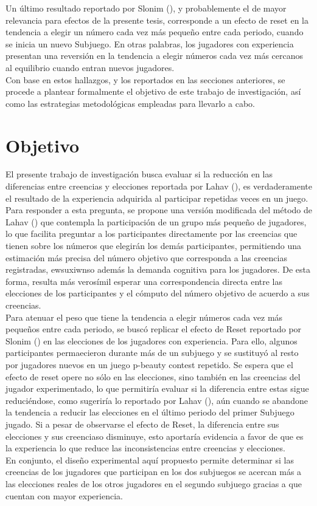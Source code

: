 Un último resultado reportado por Slonim (\citeyear{Slonim}), y probablemente el de mayor relevancia para efectos de la presente tesis, corresponde a un efecto de reset en la tendencia a elegir un número cada vez más pequeño entre cada periodo, cuando se inicia un nuevo Subjuego. En otras palabras, los jugadores con experiencia presentan una reversión en la tendencia a elegir números cada vez más cercanos al equilibrio cuando entran nuevos jugadores.\\

Con base en estos hallazgos, y los reportados en las secciones anteriores, se procede a plantear formalmente el objetivo de este trabajo de investigación, así como las estrategias metodológicas empleadas para llevarlo a cabo. \\

\section{Objetivo}

El presente trabajo de investigación busca evaluar si la reducción en las diferencias entre creencias y elecciones reportada por Lahav (\citeyear{Lahav}), es verdaderamente el resultado de la experiencia adquirida al participar repetidas veces en un juego.\\

Para responder a esta pregunta, se propone una versión modificada del método de Lahav (\citeyear{Lahav}) que contempla la participación de un grupo más pequeño de jugadores, lo que facilita preguntar a los participantes directamente por las creencias que tienen sobre los números que elegirán los demás participantes, permitiendo una estimación más precisa del número objetivo que corresponda a las creencias registradas, ewsuxiwnso además la demanda cognitiva para los jugadores. De esta forma, resulta más verosímil esperar una correspondencia directa entre las elecciones de los participantes y el cómputo del número objetivo de acuerdo a sus creencias.\\

Para atenuar el peso que tiene la tendencia a elegir números cada vez más pequeños entre cada periodo, se buscó replicar el efecto de Reset reportado por Slonim (\citeyear{Slonim}) en las elecciones de los jugadores con experiencia. Para ello, algunos participantes permaecieron durante más de un subjuego y se sustituyó al resto por jugadores nuevos en un juego p-beauty contest repetido. Se espera que el efecto de reset opere no sólo en las elecciones, sino también en las creencias del jugador experimentado, lo que permitiría evaluar si la diferencia entre estas sigue reduciéndose, como sugeriría lo reportado por Lahav (\citeyear{Lahav}), aún cuando se abandone la tendencia a reducir las elecciones en el último periodo del primer Subjuego jugado. Si a pesar de observarse el efecto de Reset, la diferencia entre sus elecciones y sus creenciaso disminuye, esto aportaría evidencia a favor de que es la experiencia lo que reduce las inconsistencias entre creencias y elecciones.\\

En conjunto, el diseño experimental aquí propuesto permite determinar si las creencias de los jugadores que participan en los dos subjuegos se acercan más a las elecciones reales de los otros jugadores en el segundo subjuego gracias a que cuentan con mayor experiencia.\\

